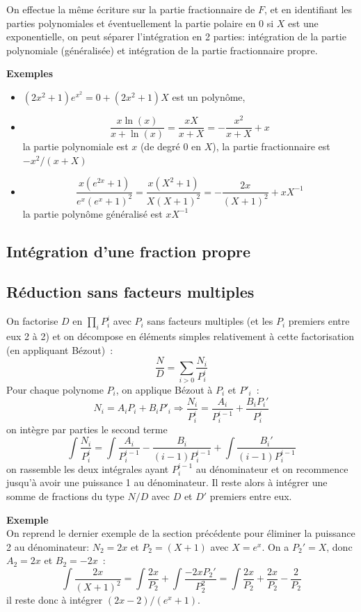 \documentclass[a4paper,11pt]{book}
\begin{document}
\begin{giacjshere}
On effectue la même écriture sur la partie fractionnaire de $F$,
et en identifiant les parties polynomiales et éventuellement la partie
polaire en 0 si $X$ est une exponentielle, on peut séparer l'intégration
en 2 parties: intégration de la partie polynomiale (généralisée)
et intégration de la partie fractionnaire propre.

{\bf Exemples}
\begin{itemize}
\item $ (2x^2+1) e^{x^2} = 0+(2x^2+1)X$ est un polynôme,
\item 
\[ \frac{x \ln(x)}{x+\ln(x)} = \frac{xX}{x+X}=-\frac{x^2}{x+X}+x\]
la partie polynomiale est $x$ (de degré 0 en $X$), la partie fractionnaire
est $-x^2/(x+X)$
\item 
\[ \frac{x(e^{2x}+1)}{e^x(e^x+1)^2}=\frac{x(X^2+1)}{X(X+1)^2}
= -\frac{2x}{(X+1)^2} + xX^{-1}\]
la partie polynôme généralisé est $xX^{-1}$
\end{itemize}

\subsection{Intégration d'une fraction propre}
\subsection{Réduction sans facteurs multiples}
On factorise $D$ en $\prod_i P_i^i$ avec $P_i$ sans facteurs multiples 
(et les $P_i$ premiers entre eux 2 \`a 2) et on décompose
en éléments simples relativement à cette factorisation (en appliquant
Bézout)~:
\[ \frac{N}{D} = \sum_{i>0} \frac{N_i}{P_i^i} \]
Pour chaque polynome $P_i$, on applique Bézout à $P_i$ et $P'_i$~:
\[ N_i = A_iP_i+B_iP'_i \Rightarrow \frac{N_i}{P_i^i}=\frac{A_i}{P_i^{i-1}}
+ \frac{B_iP_i'}{P_i^i}\]
on intègre par parties le second terme
\[ \int \frac{N_i}{P_i^i} = \int \frac{A_i}{P_i^{i-1}}
- \frac{B_i}{(i-1)P_i^{i-1}} + \int \frac{B_i'}{(i-1)P_i^{i-1}}  \]
on rassemble les deux int\'egrales ayant $P_i^{i-1}$ au dénominateur
et on recommence jusqu'à avoir une puissance 1 au dénominateur. Il reste
alors \`a int\'egrer une somme de fractions du type $N/D$ avec
$D$ et $D'$ premiers entre eux.

{\bf Exemple}\\
On reprend le dernier exemple de la section précédente pour
éliminer la puissance 2 au dénominateur:
$N_2=2x$ et $P_2=(X+1)$ avec $X=e^x$. On a $P_2'=X$, donc $A_2=2x$ et
$B_2=-2x$~:
\[ \int \frac{2x}{(X+1)^2} =\int \frac{2x}{P_2} + 
\int \frac{-2x P_2'}{P_2^2} = \int \frac{2x}{P_2} + \frac{2x}{P_2}
- \frac{2}{P_2}\]
il reste donc à intégrer $(2x-2)/(e^x+1)$.


\end{giacjshere}
\end{document}
